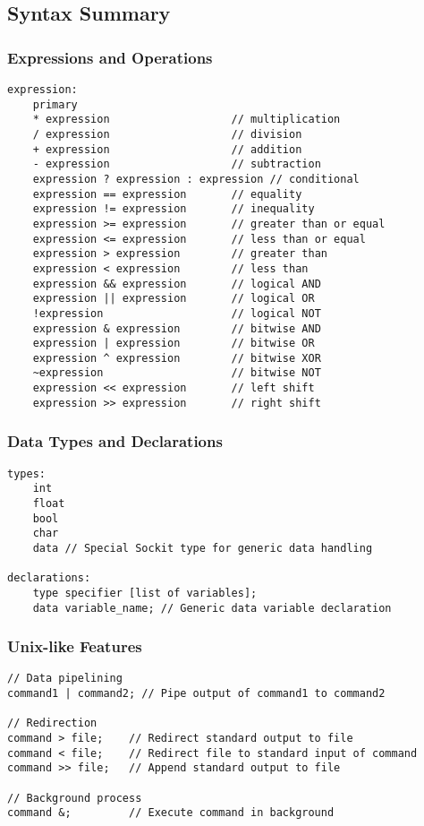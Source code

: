 \documentclass[12pt,a4paper]{article} %
\begin{document}
\subsection*{Syntax Summary}
\subsubsection*{Expressions and Operations}
\begin{verbatim}
expression:
    primary
    * expression                   // multiplication
    / expression                   // division
    + expression                   // addition
    - expression                   // subtraction
    expression ? expression : expression // conditional
    expression == expression       // equality
    expression != expression       // inequality
    expression >= expression       // greater than or equal
    expression <= expression       // less than or equal
    expression > expression        // greater than
    expression < expression        // less than
    expression && expression       // logical AND
    expression || expression       // logical OR
    !expression                    // logical NOT
    expression & expression        // bitwise AND
    expression | expression        // bitwise OR
    expression ^ expression        // bitwise XOR
    ~expression                    // bitwise NOT
    expression << expression       // left shift
    expression >> expression       // right shift

\end{verbatim}

\subsubsection*{Data Types and Declarations}
\begin{verbatim}
types:
    int
    float
    bool
    char
    data // Special Sockit type for generic data handling

declarations:
    type specifier [list of variables];
    data variable_name; // Generic data variable declaration

\end{verbatim}

\subsubsection*{Unix-like Features}
\begin{verbatim}
// Data pipelining
command1 | command2; // Pipe output of command1 to command2

// Redirection
command > file;    // Redirect standard output to file
command < file;    // Redirect file to standard input of command
command >> file;   // Append standard output to file

// Background process
command &;         // Execute command in background

\end{verbatim}
\end{document}
